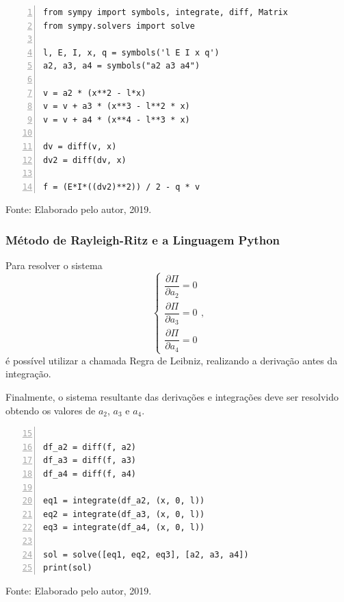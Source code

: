 \documentclass{beamer}
\newcommand{\fonte}[1]{
	\begin{center}
		\footnotesize Fonte: #1
	\end{center}
}
\newcommand{\fonteElaboradoPeloAutor}{
	\fonte{Elaborado pelo autor, 2019.}
}
\begin{document}
	\begin{frame}[containsverbatim]
		\begin{lstlisting}[style=Python,numbers=left, caption={Definição da Função Aproximada e Integrando}, captionpos=t]
from sympy import symbols, integrate, diff, Matrix
from sympy.solvers import solve

l, E, I, x, q = symbols('l E I x q')
a2, a3, a4 = symbols("a2 a3 a4")

v = a2 * (x**2 - l*x) 
v = v + a3 * (x**3 - l**2 * x)
v = v + a4 * (x**4 - l**3 * x)

dv = diff(v, x)
dv2 = diff(dv, x)

f = (E*I*((dv2)**2)) / 2 - q * v
		\end{lstlisting}
		\fonteElaboradoPeloAutor
	\end{frame}
	
	\begin{frame}
		\frametitle{Método de Rayleigh-Ritz e a Linguagem Python}
		\justify
		
		Para resolver o sistema
		$$
			\begin{cases}
				\dfrac{\partial \Pi}{\partial a_2}=0\\[10pt]
				\dfrac{\partial \Pi}{\partial a_3}=0\\[10pt]
				\dfrac{\partial \Pi}{\partial a_4}=0
			\end{cases}
			\text{,}
		$$
		é possível utilizar a chamada Regra de Leibniz, realizando a derivação antes da integração.
		\vspace{10pt}
		\pause
		
		Finalmente, o sistema resultante das derivações e integrações deve ser resolvido obtendo os valores de $a_2$, $a_3$ e $a_4$.
	\end{frame}
	
	\begin{frame}[containsverbatim]
		\begin{lstlisting}[style=Python, numbers=left, firstnumber=15, caption={Definição da Função Aproximada e Integrando}, captionpos=t]

df_a2 = diff(f, a2)
df_a3 = diff(f, a3)
df_a4 = diff(f, a4)

eq1 = integrate(df_a2, (x, 0, l))
eq2 = integrate(df_a3, (x, 0, l))
eq3 = integrate(df_a4, (x, 0, l))

sol = solve([eq1, eq2, eq3], [a2, a3, a4])
print(sol)
		\end{lstlisting}
		\fonteElaboradoPeloAutor
	\end{frame}
	
\end{document}

